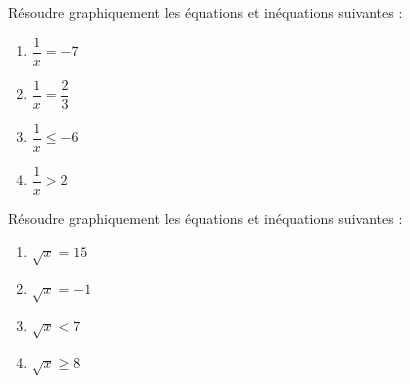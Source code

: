 \documentclass[a4paper]{article}
\begin{document}
%

\exo[4 points] Résoudre graphiquement les équations et inéquations suivantes :
\smallskip
\begin{multicols}{4}
  \begin{enumerate}
    \item $\dfrac{1}{x}=-7$
    \item $\dfrac{1}{x}=\dfrac{2}{3}$
    \item $\dfrac{1}{x}\leq -6$
    \item $\dfrac{1}{x}> 2$
  \end{enumerate}
\end{multicols}

\dotfill{}

\bigskip

\exo[4 points] Résoudre graphiquement les équations et inéquations suivantes :
\smallskip
\begin{multicols}{4}
  \begin{enumerate}
    \item $\sqrt{x}=15$
    \item $\sqrt{x}=-1$
    \item $\sqrt{x}< 7$
    \item $\sqrt{x}\geq 8$
  \end{enumerate}
\end{multicols}
\end{document}
